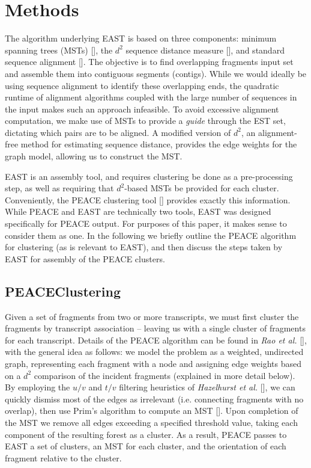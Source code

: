 \documentclass{bioinfo}
\newcommand{\peace} {{\small PEACE}}
\newcommand{\east} {{\small EAST}}
\begin{document}
\section*{Methods}

The algorithm underlying \east\/ is based on three components: minimum
spanning trees (MSTs) [\cite{Prim57}], the $d^2$ sequence distance
measure [\cite{Hide94}], and standard sequence alignment
[\cite{Needleman70,Smith81}].  The objective is to find overlapping
fragments input set and assemble them into contiguous segments
(contigs).  While we would ideally be using sequence alignment to
identify these overlapping ends, the quadratic runtime of alignment
algorithms coupled with the large number of sequences in the input
makes such an approach infeasible.  To avoid excessive alignment
computation, we make use of MSTs to provide a {\it guide} through the
EST set, dictating which pairs are to be aligned.  A modified version
of $d^2$, an alignment-free method for estimating sequence distance,
provides the edge weights for the graph model, allowing us to
construct the MST.


\east\/ is an assembly tool, and requires clustering be
done as a pre-processing step, as well as requiring that $d^2$-based
MSTs be provided for each cluster.  Conveniently, the \peace\/
clustering tool [\cite{Rao10}] provides exactly this information.  While
\peace\/ and \east\/ are technically two tools, \east\/ was designed
specifically for \peace\/ output.  For purposes of this paper, it
makes sense to consider them as one.  In the following we briefly
outline the \peace\/ algorithm for clustering (as is relevant to
\east\/), and then discuss the steps taken by \east\/ for assembly of
the \peace\/ clusters.

\subsection*{\peace Clustering}

Given a set of fragments from two or more transcripts, we must first
cluster the fragments by transcript association -- leaving us with a
single cluster of fragments for each transcript.  Details of the
\peace\/ algorithm can be found in {\it Rao et al.} [\cite{Rao10}],
with the general idea as follows: we model the problem as a weighted,
undirected graph, representing each fragment with a node and assigning
edge weights based on a $d^2$ comparison of the incident fragments
(explained in more detail below).  By employing the $u/v$ and $t/v$
filtering heuristics of {\it Hazelhurst et al.} [\cite{Hazelhurst08}],
we can quickly dismiss most of the edges as irrelevant
(i.e. connecting fragments with no overlap), then use Prim's algorithm
to compute an MST [\cite{Prim57}].  Upon completion of the MST we
remove all edges exceeding a specified threshold value, taking each
component of the resulting forest as a cluster.  As a result, \peace\/
passes to \east\/ a set of clusters, an MST for each cluster, and the
orientation of each fragment relative to the cluster.
\end{document}
